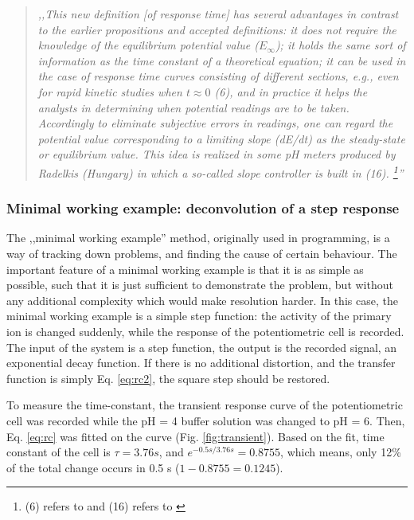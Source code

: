 \begin{quote}
\vspace{0.5cm}
\emph{,,This new definition [of response time] has several advantages in contrast to the earlier propositions and accepted definitions: it does not require the knowledge of the equilibrium potential value ($E_{\infty}$); it holds the same sort of information as the time constant of a theoretical equation; it can be used in the case of response time curves consisting of different sections, e.g., even for rapid kinetic studies when $t \approx 0$ (6), and in practice it helps the analysts in determining when potential readings are to be taken.
Accordingly to eliminate subjective errors in readings, one can regard the potential value corresponding to a limiting slope (dE/dt) as the steady-state or equilibrium value.
This idea is realized in some pH meters produced by Radelkis (Hungary) in which a so-called slope controller is built in (16).
\footnote{(6) refers to \cite{lindner1982response} and (16) refers to \cite{havas1981}}''}
\vspace{0.5cm}
\end{quote}


			\subsubsection{Minimal working example: deconvolution of a step response}
The ,,minimal working example'' method, originally used in programming, is a way of tracking down problems, and finding the cause of certain behaviour.
The important feature of a minimal working example is that it is as simple as possible, such that it is just sufficient to demonstrate the problem, but without any additional complexity which would make resolution harder.
In this case, the minimal working example is a simple step function: the activity of the primary ion is changed suddenly, while the response of the potentiometric cell is recorded.
The input of the system is a step function, the output is the recorded signal, an exponential decay function.
If there is no additional distortion, and the transfer function is simply Eq. \ref{eq:rc2}, the square step should be restored. 

To measure the time-constant, the transient response curve of the potentiometric cell was recorded while the pH = 4 buffer solution was changed to pH = 6.
Then, Eq. \ref{eq:rc} was fitted on the curve (Fig. \ref{fig:transient}).
Based on the fit, time constant of the cell is $\tau = 3.76 s$, and $e^{-0.5s/3.76s} = 0.8755$, which means, only 12\% of the total change occurs in 0.5 s ($1 - 0.8755 = 0.1245$). 

